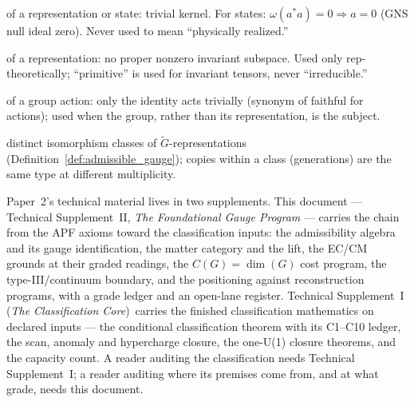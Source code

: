 \documentclass[11pt]{article}
\theoremstyle{definition}
\newcommand{\TSI}{Technical Supplement~I (\emph{The Classification Core})}
\begin{document}
\begin{tcolorbox}[apfbox, title={Terminology: four words with one fixed meaning each}]
\footnotesize
\begin{description}[nosep,leftmargin=1.6em]
  \item[faithful] of a representation or state: trivial kernel.  For
  states: $\omega(a^*a) = 0 \Rightarrow a = 0$ (GNS null ideal zero).
  Never used to mean ``physically realized.''
  \item[irreducible] of a representation: no proper nonzero invariant
  subspace.  Used only rep-theoretically; ``primitive'' is used for
  invariant tensors, never ``irreducible.''
  \item[effective] of a group action: only the identity acts trivially
  (synonym of faithful for actions); used when the group, rather than
  its representation, is the subject.
  \item[physically distinct (multiplet types)] distinct isomorphism
  classes of $\widetilde{G}$-representations
  (Definition~\ref{def:admissible_gauge}); copies within a class
  (generations) are the same type at different multiplicity.
\end{description}
\end{tcolorbox}

\medskip
\begin{tcolorbox}[apfbox, title={Reader's map: one paper, two supplements}]
\footnotesize
Paper~2's technical material lives in two supplements.  This document
--- Technical Supplement~II, \emph{The Foundational Gauge Program} ---
carries the chain from the APF axioms toward the classification
inputs: the admissibility algebra and its gauge identification, the
matter category and the lift, the EC/CM grounds at their graded
readings, the $C(G)=\dim(G)$ cost program, the type-III/continuum
boundary, and the positioning against reconstruction programs, with a
grade ledger and an open-lane register.  \TSI\ carries the finished
classification mathematics on declared inputs --- the conditional
classification theorem with its C1--C10 ledger, the scan, anomaly and
hypercharge closure, the one-U(1) closure theorems, and the capacity
count.  A reader auditing the classification needs Technical
Supplement~I; a reader auditing where its premises come from, and at
what grade, needs this document.
\end{tcolorbox}
\end{document}
